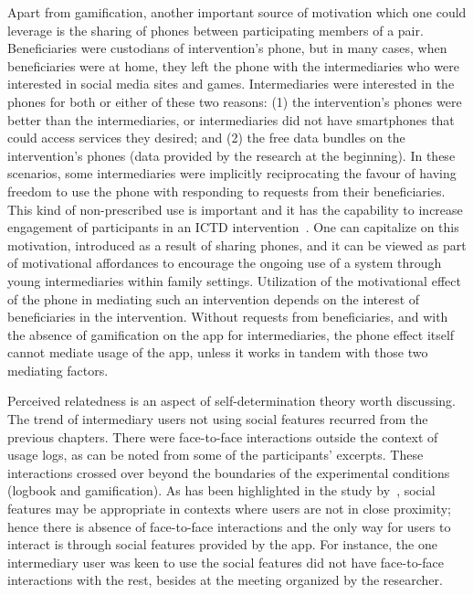 Apart from gamification, another important source of motivation which one could leverage is the sharing of phones between participating members of a pair. Beneficiaries were custodians of intervention's phone, but in many cases, when beneficiaries were at home, they left the phone with the intermediaries who were interested in social media sites and games. Intermediaries were interested in the phones for both or either of these two reasons: (1) the intervention's phones were better than the intermediaries, or intermediaries did not have smartphones that could access services they desired; and (2) the free data bundles on the intervention's phones (data provided by the research at the beginning). In these scenarios, some intermediaries were implicitly reciprocating the favour of having freedom to use the phone with responding to requests from their beneficiaries. This kind of non-prescribed use is important and it has the capability to increase engagement of participants in an ICTD intervention~\citep{ferrplay2015}. One can capitalize on this motivation, introduced as a result of sharing phones, and it can be viewed as part of motivational affordances to encourage the ongoing use of a system through young intermediaries within family settings. Utilization of the motivational effect of the phone in mediating such an intervention depends on the interest of beneficiaries in the intervention. Without requests from beneficiaries, and with the absence of gamification on the app for intermediaries, the phone effect itself cannot mediate usage of the app, unless it works in tandem with those two mediating factors.

Perceived relatedness is an aspect of self-determination theory worth discussing. The trend of intermediary users not using social features recurred from the previous chapters. There were face-to-face interactions outside the context of usage logs, as can be noted from some of the participants' excerpts. These interactions crossed over beyond the boundaries of the experimental conditions (logbook and gamification). As has been highlighted in the study by~\cite{lin2006:fish}, social features may be appropriate in contexts where users are not in close proximity; hence there is absence of face-to-face interactions and the only way for users to interact is through social features provided by the app. For instance, the one intermediary user was keen to use the social features did not have face-to-face interactions with the rest, besides at the meeting organized by the researcher. 
